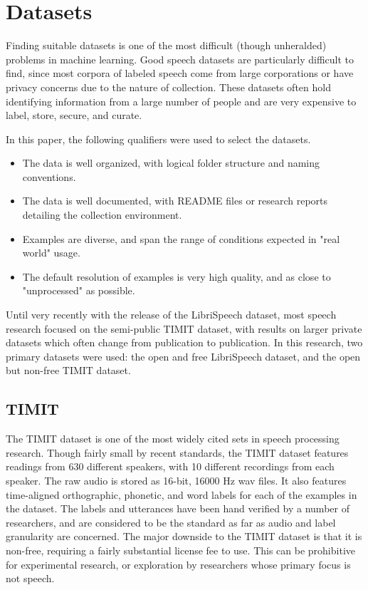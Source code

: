\documentclass{article} %
\begin{document}
\section{Datasets}
Finding suitable datasets is one of the most difficult (though unheralded) 
problems in machine learning. Good speech datasets are particularly difficult
to find, since most corpora of labeled speech come from 
large corporations or have privacy concerns due to the nature of collection.
These datasets often hold identifying information from a large number of
people and are very expensive to label, store, secure, and curate.
\par
In this paper, the following qualifiers were used to select the datasets.
\begin{itemize}
    \item The data is well organized, with logical folder structure and naming conventions.
    \item The data is well documented, with README files or research reports detailing the collection environment.
    \item Examples are diverse, and span the range of conditions expected in "real world" usage. 
    \item The default resolution of examples is very high quality, and as close to "unprocessed" as possible.
\end{itemize}

Until very recently
with the release of the LibriSpeech dataset, most speech research
focused on the semi-public TIMIT dataset, with results on larger private
datasets which often change from publication to publication. In this research,
two primary datasets were used: the open and free LibriSpeech dataset, and
the open but non-free TIMIT dataset.
\subsection{TIMIT}
The TIMIT dataset is one of the most widely cited sets in speech processing research.
Though fairly small by recent standards, the TIMIT dataset features readings from 630 different speakers, with 10 different recordings from each speaker. The raw audio is stored as 16-bit, 16000 Hz wav files. It also features time-aligned orthographic, phonetic, and word labels for
each of the examples in the dataset. The labels and utterances have been hand verified by a number of researchers, and are considered to be the standard as far as audio and label granularity are concerned. The major downside to the TIMIT dataset is that it is non-free,
requiring a fairly substantial license fee to use. This can be prohibitive
for experimental research, or exploration by researchers whose primary focus
is not speech.
\end{document}
